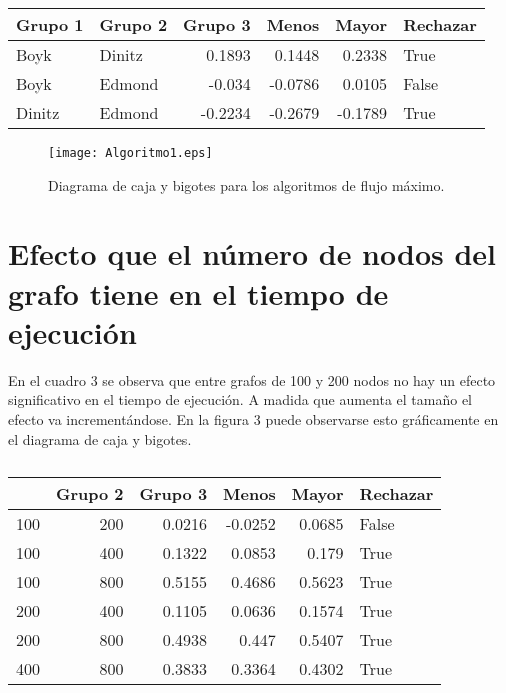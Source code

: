 \documentclass{article}
\begin{document}
\begin{table}[htbp]
  \centering
  \caption{}
    \begin{tabular}{|l|l|r|r|r|l|}
    \toprule
    \rowcolor[rgb]{ .357,  .608,  .835} \textbf{Grupo 1} & \textbf{Grupo 2} & \multicolumn{1}{l|}{\textbf{Grupo 3}} & \multicolumn{1}{l|}{\textbf{Menos}} & \multicolumn{1}{l|}{\textbf{Mayor}} & \textbf{Rechazar} \\
    \midrule
    Boyk  & Dinitz & 0.1893 & 0.1448 & 0.2338 & True \\
    \midrule
    Boyk  & Edmond & -0.034 & -0.0786 & 0.0105 & False \\
    \midrule
    Dinitz & Edmond & -0.2234 & -0.2679 & -0.1789 & True \\
    \bottomrule
    \end{tabular}%
  \label{tab:Cuadro 2}%
\end{table}%

\begin{figure}
\begin{center}
  \texttt{[image: Algoritmo1.eps]}
\end{center}
\vspace*{-8mm}
\caption{Diagrama de caja y bigotes para los algoritmos de flujo máximo.}
  \label{Figura 3} 
\end{figure}

\section*{Efecto que el número de nodos del grafo tiene en el tiempo de ejecución}

En el cuadro 3 se observa que entre grafos de 100 y 200 nodos no hay un efecto significativo en el tiempo de ejecución. A madida que aumenta el tamaño el efecto va incrementándose. En la figura 3 puede observarse esto gráficamente en el diagrama de caja y bigotes. 


\begin{table}[htbp]
  \centering
  \caption{}
    \begin{tabular}{|r|r|r|r|r|l|}
    \toprule
    \rowcolor[rgb]{ .357,  .608,  .835} \multicolumn{1}{|l|}{\textbf{Grupo 1}} & \multicolumn{1}{l|}{\textbf{Grupo 2}} & \multicolumn{1}{l|}{\textbf{Grupo 3}} & \multicolumn{1}{l|}{\textbf{Menos}} & \multicolumn{1}{l|}{\textbf{Mayor}} & \multicolumn{1}{l|}{\textbf{Rechazar}} \\
    \midrule
    100   & 200   & 0.0216 & -0.0252 & 0.0685 & False \\
     \midrule
    100   & 400   & 0.1322 & 0.0853 & 0.179 & True \\
     \midrule
    100   & 800   & 0.5155 & 0.4686 & 0.5623 & True \\
     \midrule
    200   & 400   & 0.1105 & 0.0636 & 0.1574 & True \\
     \midrule
    200   & 800   & 0.4938 & 0.447 & 0.5407 & True \\
     \midrule
    400   & 800   & 0.3833 & 0.3364 & 0.4302 & True \\
     \midrule
    \end{tabular}%
  \label{tab:Cuadro 3}
\end{table}
\end{document}
